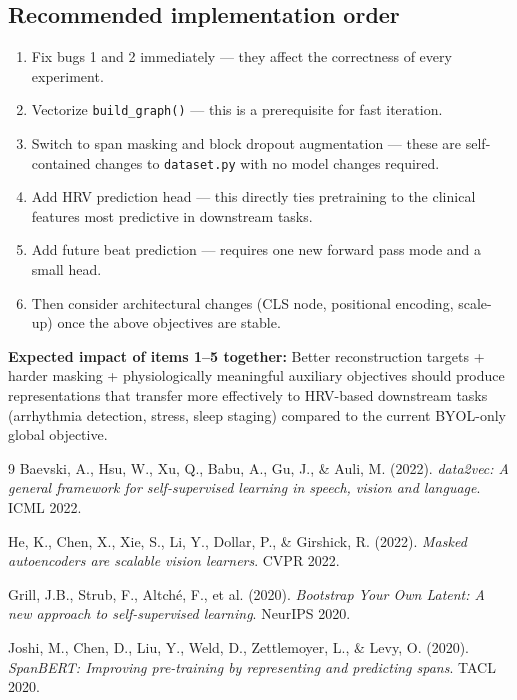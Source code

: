 \documentclass[11pt,a4paper]{article}
\newcommand{\file}[1]{\texttt{#1}}
\begin{document}
\subsection*{Recommended implementation order}

\begin{enumerate}[leftmargin=*]
    \item Fix bugs 1 and 2 immediately --- they affect the correctness of every experiment.
    \item Vectorize \texttt{build\_graph()} --- this is a prerequisite for fast iteration.
    \item Switch to span masking and block dropout augmentation --- these are self-contained changes to \file{dataset.py} with no model changes required.
    \item Add HRV prediction head --- this directly ties pretraining to the clinical features most predictive in downstream tasks.
    \item Add future beat prediction --- requires one new forward pass mode and a small head.
    \item Then consider architectural changes (CLS node, positional encoding, scale-up) once the above objectives are stable.
\end{enumerate}

\medskip
\noindent\textbf{Expected impact of items 1--5 together:}
Better reconstruction targets + harder masking + physiologically meaningful auxiliary objectives
should produce representations that transfer more effectively to HRV-based downstream tasks
(arrhythmia detection, stress, sleep staging) compared to the current BYOL-only global objective.

\begin{thebibliography}{9}
Baevski, A., Hsu, W., Xu, Q., Babu, A., Gu, J., \& Auli, M. (2022).
\textit{data2vec: A general framework for self-supervised learning in speech, vision and language}.
ICML 2022.

He, K., Chen, X., Xie, S., Li, Y., Dollar, P., \& Girshick, R. (2022).
\textit{Masked autoencoders are scalable vision learners}.
CVPR 2022.

Grill, J.B., Strub, F., Altch\'e, F., et al. (2020).
\textit{Bootstrap Your Own Latent: A new approach to self-supervised learning}.
NeurIPS 2020.

Joshi, M., Chen, D., Liu, Y., Weld, D., Zettlemoyer, L., \& Levy, O. (2020).
\textit{SpanBERT: Improving pre-training by representing and predicting spans}.
TACL 2020.
\end{thebibliography}
\end{document}
